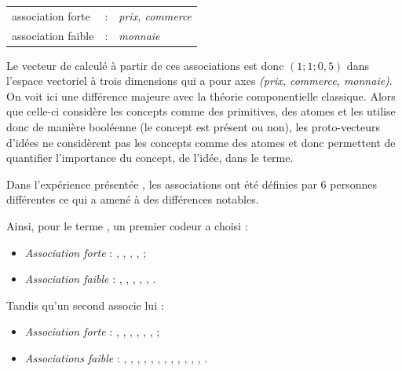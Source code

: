 {\begin{center}
 \begin{tabular}{lll}

  association forte &:& \emph{prix, commerce}\\

  association faible &:& \emph{monnaie}
\end{tabular}
\end{center}

Le vecteur de  calculé à partir de ces associations
est donc $(1; 1; 0,5)$ dans l'espace vectoriel à trois dimensions qui
a pour axes \emph{(prix, commerce, monnaie)}. On voit ici une
différence majeure avec la théorie componentielle classique. Alors que
celle-ci considère les concepts comme des primitives, des atomes et
les utilise donc de manière booléenne (le concept est présent ou non),
les proto-vecteurs d'idées ne considèrent pas les concepts comme des
atomes et donc permettent de quantifier l'importance du concept, de
l'idée, dans le terme.

Dans l'expérience présentée \cite{Chauche1990}, les associations ont
été définies par 6 personnes différentes ce qui a amené à des
différences notables.

Ainsi, pour le terme , un premier codeur a choisi :

\begin{itemize}
  
\item \emph{Association forte} : ,
  , , ,
   ;
  
\item \emph{Association faible} : ,
  , , ,
  , .

\end{itemize}

Tandis qu'un second associe lui :

\begin{itemize}
  
\item \emph{Association forte} : , ,
  , , ,
  ,  ;
  
\item \emph{Associations faible} : ,
  , , ,
  , , ,
  , , ,
  , , .


\end{itemize}}
